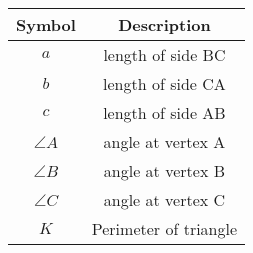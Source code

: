 \begin{tabular}[12pt]{ |c|c|}
    \hline
    \textbf{Symbol} & \textbf{Description} \\
    \hline
    \textbf{$a$} & length of side BC\\
    \hline
    \textbf{$b$} & length of side CA\\
    \hline
    \textbf{$c$} & length of side AB\\
    \hline
    $\angle A$ & angle at vertex A\\
    \hline
    $\angle B$ & angle at vertex B\\
    \hline
    $\angle C$ & angle at vertex C\\
    \hline
    \textbf{$K$} & Perimeter of triangle\\
    \hline
    \end{tabular}
